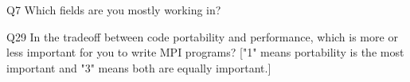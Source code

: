 \begin{description}%
\item{Q7} Which fields are you mostly working in?%
\item{Q29} In the tradeoff between code portability and performance, which is more or less important for you to write MPI programs? ["1" means portability is the most important and "3" means both are equally important.]%
\end{description}%
